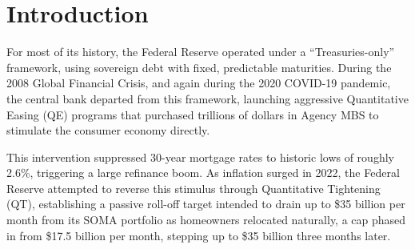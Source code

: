 \documentclass[12pt]{article}
\begin{document}
\section{Introduction}\label{sec:intro}

For most of its history, the Federal Reserve operated under a ``Treasuries-only'' framework, using sovereign debt with fixed, predictable maturities. During the 2008 Global Financial Crisis, and again during the 2020 COVID-19 pandemic, the central bank departed from this framework, launching aggressive Quantitative Easing (QE) programs that purchased trillions of dollars in Agency MBS to stimulate the consumer economy directly.

This intervention suppressed 30-year mortgage rates to historic lows of roughly 2.6\%, triggering a large refinance boom. As inflation surged in 2022, the Federal Reserve attempted to reverse this stimulus through Quantitative Tightening (QT), establishing a passive roll-off target intended to drain up to \$35 billion per month from its SOMA portfolio as homeowners relocated naturally, a cap phased in from \$17.5 billion per month, stepping up to \$35 billion three months later.
\end{document}

